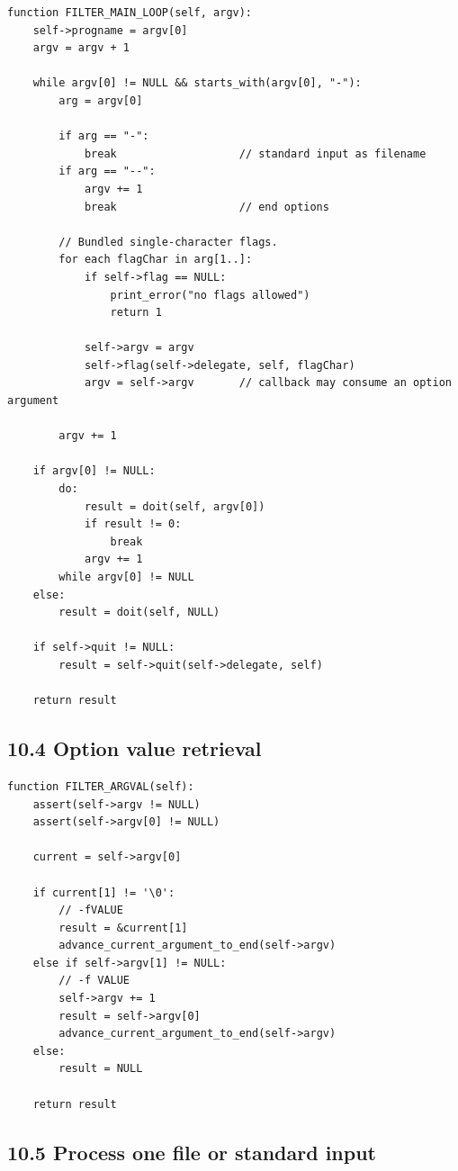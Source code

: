 \documentclass[11pt]{article}
\begin{document}
\begin{verbatim}
function FILTER_MAIN_LOOP(self, argv):
    self->progname = argv[0]
    argv = argv + 1

    while argv[0] != NULL && starts_with(argv[0], "-"):
        arg = argv[0]

        if arg == "-":
            break                   // standard input as filename
        if arg == "--":
            argv += 1
            break                   // end options

        // Bundled single-character flags.
        for each flagChar in arg[1..]:
            if self->flag == NULL:
                print_error("no flags allowed")
                return 1

            self->argv = argv
            self->flag(self->delegate, self, flagChar)
            argv = self->argv       // callback may consume an option argument

        argv += 1

    if argv[0] != NULL:
        do:
            result = doit(self, argv[0])
            if result != 0:
                break
            argv += 1
        while argv[0] != NULL
    else:
        result = doit(self, NULL)

    if self->quit != NULL:
        result = self->quit(self->delegate, self)

    return result
\end{verbatim}

\subsection{10.4 Option value retrieval}\label{option-value-retrieval}

\begin{verbatim}
function FILTER_ARGVAL(self):
    assert(self->argv != NULL)
    assert(self->argv[0] != NULL)

    current = self->argv[0]

    if current[1] != '\0':
        // -fVALUE
        result = &current[1]
        advance_current_argument_to_end(self->argv)
    else if self->argv[1] != NULL:
        // -f VALUE
        self->argv += 1
        result = self->argv[0]
        advance_current_argument_to_end(self->argv)
    else:
        result = NULL

    return result
\end{verbatim}

\subsection{10.5 Process one file or standard
input}\label{process-one-file-or-standard-input}
\end{document}
